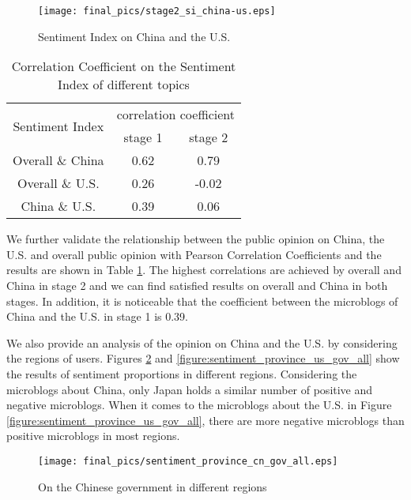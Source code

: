 \documentclass[sigconf, nonacm=true]{acmart}
\begin{document}
\begin{figure}[t]
  \texttt{[image: final\_pics/stage2\_si\_china-us.eps]}
  \caption{Sentiment Index on China and the U.S.}
  \label{figure:stage2_si_gov}
\end{figure}


\begin{table}[h]
\small%
\begin{tabular}{|c|c|c|}
\hline
\multirow{2}{*}{Sentiment Index} & \multicolumn{2}{c|}{correlation coefficient} \\ \cline{2-3}
                            &       stage 1     &      stage 2     \\ \hline
          Overall \&  China   &      0.62    &      0.79     \\ \hline
          Overall \&  U.S.    &       0.26    &        -0.02   \\ \hline
          China   \& U.S.     &        0.39   &       0.06    \\ \hline
\end{tabular}
\caption{Correlation Coefficient on the Sentiment Index of different topics}
\vspace{-0.3cm}
\label{table:corr_gov}
\end{table}
\vspace{-0.3cm}
We further validate the relationship between the public opinion on China, the U.S. and overall public opinion with Pearson Correlation Coefficients and the results are shown in Table \ref{table:corr_gov}.
The highest correlations are achieved by overall and China in stage 2 and we can find satisfied results on overall and China in both stages.
In addition, it is noticeable that the coefficient between the microblogs of China and the U.S. in stage 1 is 0.39.

We also provide an analysis of the opinion on China and the U.S. by considering the  regions of users.
Figures \ref{figure:sentiment_province_cn_gov_all} and \ref{figure:sentiment_province_us_gov_all} show the results of sentiment proportions in different regions.
Considering the microblogs about China, only Japan holds a similar number of positive and negative microblogs.
When it comes to the microblogs about the U.S. in Figure \ref{figure:sentiment_province_us_gov_all}, there are more negative microblogs than positive microblogs in most regions.
\begin{figure}[t]
  \texttt{[image: final\_pics/sentiment\_province\_cn\_gov\_all.eps]}
  \vspace{-0.3cm}
  \caption{On the Chinese government in different regions}
  \vspace{-0.3cm}
  \label{figure:sentiment_province_cn_gov_all}
\end{figure}
\end{document}
